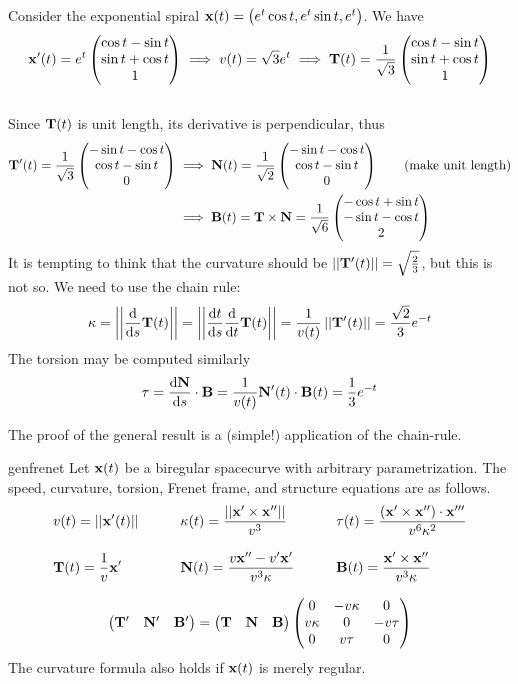 \begin{example}{}{}
Consider the exponential spiral $\vx(t)=\bigl(e^t\cos t,e^t\sin t,e^t\bigr)$. We have
\[
	\vx'(t)=e^t\threevec{\cos t-\sin t}{\sin t+\cos t}1 \implies v(t)=\sqrt 3e^t \implies \vT(t)=\frac{1}{\sqrt 3}\threevec{\cos t-\sin t}{\sin t+\cos t}1
\]\\ %
Since $\vT(t)$ is unit length, its derivative is perpendicular, thus
\begin{align*}
	\vT'(t)=\frac 1{\sqrt 3}\threevec{-\sin t-\cos t}{\cos t-\sin t}0 
	&\implies \vN(t)=\frac 1{\sqrt 2}\threevec{-\sin t-\cos t}{\cos t-\sin t}0 \tag{make unit length}\\
	&\implies\vB(t)=\vT\times\vN=\frac{1}{\sqrt 6}\threevec{-\cos t+\sin t}{-\sin t-\cos t}{2}
\end{align*}
It is tempting to think that the curvature should be $\Nm{\vT'(t)}=\sqrt{\frac 23}$, but this is not so. We need to use the chain rule:
\[\kappa=\Nm{\diff s\vT(t)}=\Nm{\diff[t]{s}\diff t\vT(t)}=\frac 1{v(t)}\Nm{\vT'(t)}=\frac{\sqrt 2}3e^{-t}\]
The torsion may be computed similarly
\[\tau=\diff[\vN]{s}\cdot\vB =\frac 1{v(t)}\vN'(t)\cdot\vB(t)=\frac 13e^{-t}\]
\end{example}

The proof of the general result is a (simple!) application of the chain-rule.

\begin{cor}{}{genfrenet}
Let $\vx(t)$ be a biregular spacecurve with arbitrary parametrization. The speed, curvature, torsion, Frenet frame, and structure equations are as follows.
\begin{gather*}
\begin{aligned}
&v(t)=\Nm{\vx'(t)}\qquad
&&\kappa(t)=\frac{\Nm{\vx'\times\vx''}}{v^3}\qquad
&&\tau(t)=\frac{(\vx'\times\vx'')\cdot\vx'''}{v^6\kappa^2}\\[8pt]
&\vT(t)=\frac 1v\vx'\qquad
&&\vN(t)=\frac{v\vx''-v'\vx'}{v^3\kappa}\qquad
&&\vB(t)=\frac{\vx'\times\vx''}{v^3\kappa}
\end{aligned}\\[8pt]
\begin{pmatrix}
  \vT'&\vN'&\vB'
  \end{pmatrix}=
	\begin{pmatrix}
	\vT&\vN&\vB
	\end{pmatrix}
	\begin{pmatrix}
	0&-v\kappa &0\\v\kappa&0&-v\tau\\0&v\tau&0
	\end{pmatrix}
	\end{gather*}
	The curvature formula also holds if $\vx(t)$ is merely regular.
\end{cor}




